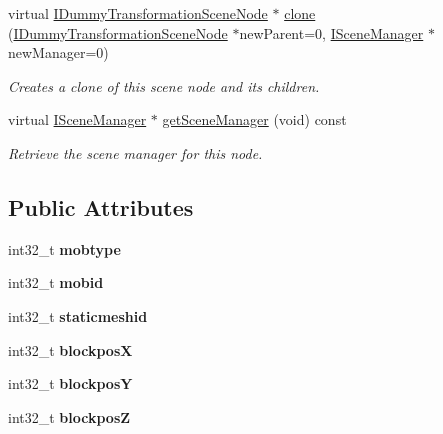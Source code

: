 \begin{DoxyCompactItemize}
virtual \hyperlink{classirr_1_1scene_1_1IDummyTransformationSceneNode}{I\+Dummy\+Transformation\+Scene\+Node} $\ast$ \hyperlink{classirr_1_1scene_1_1ISceneNode_a551a6aaa89346393a0868f609b79c133}{clone} (\hyperlink{classirr_1_1scene_1_1IDummyTransformationSceneNode}{I\+Dummy\+Transformation\+Scene\+Node} $\ast$new\+Parent=0, \hyperlink{classirr_1_1scene_1_1ISceneManager}{I\+Scene\+Manager} $\ast$new\+Manager=0)
\begin{DoxyCompactList}\small\item\em Creates a clone of this scene node and its children. \end{DoxyCompactList}\item 
virtual \hyperlink{classirr_1_1scene_1_1ISceneManager}{I\+Scene\+Manager} $\ast$ \hyperlink{classirr_1_1scene_1_1ISceneNode_a58d2c91b48c9fe5c64a7de0c801ca511}{get\+Scene\+Manager} (void) const 
\begin{DoxyCompactList}\small\item\em Retrieve the scene manager for this node. \end{DoxyCompactList}\end{DoxyCompactItemize}
\subsection*{Public Attributes}
\begin{DoxyCompactItemize}
\item 
int32\+\_\+t {\bfseries mobtype}\hypertarget{classirr_1_1scene_1_1ISceneNode_ac37e433535f36baf25691d8514905e13}{}\label{classirr_1_1scene_1_1ISceneNode_ac37e433535f36baf25691d8514905e13}

\item 
int32\+\_\+t {\bfseries mobid}\hypertarget{classirr_1_1scene_1_1ISceneNode_a9325c47fbd742b9299af222c6f0ba6e4}{}\label{classirr_1_1scene_1_1ISceneNode_a9325c47fbd742b9299af222c6f0ba6e4}

\item 
int32\+\_\+t {\bfseries staticmeshid}\hypertarget{classirr_1_1scene_1_1ISceneNode_ae2eca2dae7f8c1537f4c8c5226c56bd3}{}\label{classirr_1_1scene_1_1ISceneNode_ae2eca2dae7f8c1537f4c8c5226c56bd3}

\item 
int32\+\_\+t {\bfseries blockposX}\hypertarget{classirr_1_1scene_1_1ISceneNode_a6aee09c83c8156c2dae2b748c2630122}{}\label{classirr_1_1scene_1_1ISceneNode_a6aee09c83c8156c2dae2b748c2630122}

\item 
int32\+\_\+t {\bfseries blockposY}\hypertarget{classirr_1_1scene_1_1ISceneNode_ac4316b6ef4b10820bb8ed31a43464a25}{}\label{classirr_1_1scene_1_1ISceneNode_ac4316b6ef4b10820bb8ed31a43464a25}

\item 
int32\+\_\+t {\bfseries blockposZ}\hypertarget{classirr_1_1scene_1_1ISceneNode_ae4a9b59ac2b59b621b4e4684e81cdda1}{}\label{classirr_1_1scene_1_1ISceneNode_ae4a9b59ac2b59b621b4e4684e81cdda1}

\end{DoxyCompactItemize}
